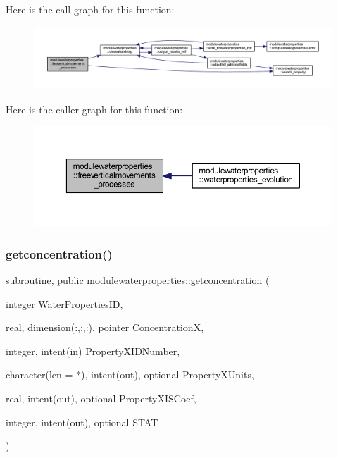 Here is the call graph for this function\+:\nopagebreak
\begin{figure}[H]
\begin{center}
\leavevmode
\includegraphics[width=350pt]{namespacemodulewaterproperties_a877a92e454e3c5723e48cbb8f6c322d8_cgraph}
\end{center}
\end{figure}
Here is the caller graph for this function\+:\nopagebreak
\begin{figure}[H]
\begin{center}
\leavevmode
\includegraphics[width=350pt]{namespacemodulewaterproperties_a877a92e454e3c5723e48cbb8f6c322d8_icgraph}
\end{center}
\end{figure}
\mbox{\label{namespacemodulewaterproperties_a45cbba90a6054db2070c49281da1ef56}} 
\subsubsection{\texorpdfstring{getconcentration()}{getconcentration()}}
{\footnotesize\ttfamily subroutine, public modulewaterproperties\+::getconcentration (\begin{DoxyParamCaption}\item[{integer}]{Water\+Properties\+ID,  }\item[{real, dimension(\+:,\+:,\+:), pointer}]{ConcentrationX,  }\item[{integer, intent(in)}]{Property\+X\+I\+D\+Number,  }\item[{character(len = $\ast$), intent(out), optional}]{Property\+X\+Units,  }\item[{real, intent(out), optional}]{Property\+X\+I\+S\+Coef,  }\item[{integer, intent(out), optional}]{S\+T\+AT }\end{DoxyParamCaption})}

